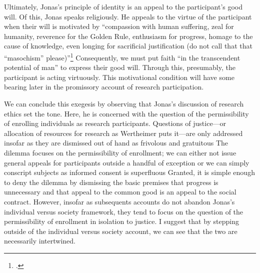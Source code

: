 \documentclass[letterpaper,notitlepage,12pt]{article}
\begin{document}
Ultimately, Jonas's principle of identity is an appeal to the participant's good will.
Of this, Jonas speaks religiously.
He appeals to the virtue of the participant when their will is motivated by ``compassion with human suffering, zeal for humanity, reverence for the Golden Rule, enthusiasm for progress, homage to the cause of knowledge, even longing for sacrificial justification (do not call that that ``masochism'' please)''\footcite[p. 236]{jonas_philosophical_1969}
Consequently, we must put faith ``in the transcendent potential of man'' to express their good will.
Through this, presumably, the participant is acting virtuously.
This motivational condition will have some bearing later in the promissory account of research participation.

We can conclude this exegesis by observing that Jonas's discussion of research ethics set the tone.
Here, he is concerned with the question of the permissibility of enrolling individuals as research participants.
Questions of justice---or allocation of resources for research as Wertheimer puts it---are only addressed insofar as they are dismissed out of hand as frivolous and gratuitous
The dilemma focuses on the permissibility of enrollment; we can either not issue general appeals for participants outside a handful of exception or we can simply conscript subjects as informed consent is superfluous
Granted, it is simple enough to deny the dilemma by dismissing the basic premises that progress is unnecessary and that appeal to the common good is an appeal to the social contract.
However, insofar as subsequents accounts do not abandon Jonas's individual versus society framework, they tend to focus on the question of the permissibility of enrollment in isolation to justice.
I suggest that by stepping outside of the individual versus society account, we can see that the two are necessarily intertwined.



\printbibliography
\end{document}
